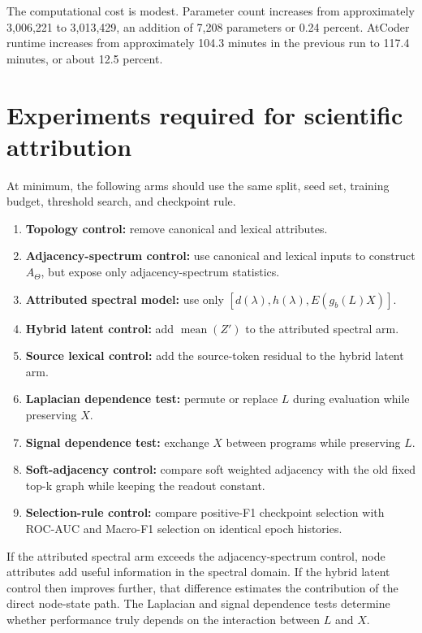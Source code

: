 \documentclass[11pt,a4paper]{article}
\newcommand{\mean}{\operatorname{mean}}
\begin{document}
The computational cost is modest. Parameter count increases from approximately
3,006,221 to 3,013,429, an addition of 7,208 parameters or 0.24 percent.
AtCoder runtime increases from approximately 104.3 minutes in the previous run
to 117.4 minutes, or about 12.5 percent.

\section{Experiments required for scientific attribution}

At minimum, the following arms should use the same split, seed set, training
budget, threshold search, and checkpoint rule.

\begin{enumerate}
\item \textbf{Topology control:} remove canonical and lexical attributes.
\item \textbf{Adjacency-spectrum control:} use canonical and lexical inputs to
construct $A_\Theta$, but expose only adjacency-spectrum statistics.
\item \textbf{Attributed spectral model:} use only
$[d(\lambda),h(\lambda),E(g_b(L)X)]$.
\item \textbf{Hybrid latent control:} add $\mean(Z')$ to the attributed
spectral arm.
\item \textbf{Source lexical control:} add the source-token residual to the
hybrid latent arm.
\item \textbf{Laplacian dependence test:} permute or replace $L$ during
evaluation while preserving $X$.
\item \textbf{Signal dependence test:} exchange $X$ between programs while
preserving $L$.
\item \textbf{Soft-adjacency control:} compare soft weighted adjacency with the
old fixed top-k graph while keeping the readout constant.
\item \textbf{Selection-rule control:} compare positive-F1 checkpoint selection
with ROC-AUC and Macro-F1 selection on identical epoch histories.
\end{enumerate}

If the attributed spectral arm exceeds the adjacency-spectrum control, node
attributes add useful information in the spectral domain. If the hybrid latent
control then improves further, that difference estimates the contribution of
the direct node-state path. The Laplacian and signal dependence tests determine
whether performance truly depends on the interaction between $L$ and $X$.
\end{document}
